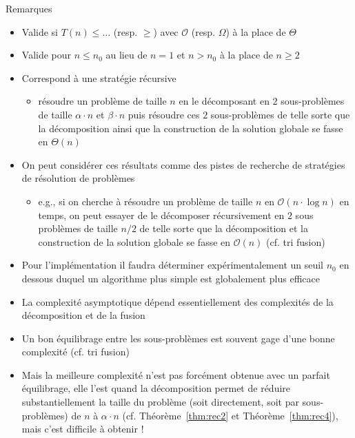 \documentclass[aspectratio=1610,francais,envcountsect]{beamer}
\begin{document}
\begin{frame}[allowframebreaks]
  \framebreak
  \begin{exampleblock}{Remarques}
    \begin{itemize}
    \item Valide si $T(n) \leq \ldots$ (resp. $\geq$) avec
      $\mathcal{O}$ (resp. $\Omega$) à la place de $\Theta$
    \item Valide pour $n \leq n_0$ au lieu de $n = 1$ et $n > n_0$ à
      la place de $n \geq 2$
    \item Correspond à une stratégie récursive
      \begin{itemize}
      \item résoudre un problème de taille $n$ en le décomposant en
        $2$ sous-problèmes de taille $\alpha\cdot n$ et $\beta\cdot n$
        puis résoudre ces $2$ sous-problèmes de telle sorte que la
        décomposition ainsi que la construction de la solution globale
        se fasse en $\Theta(n)$
      \end{itemize}
    \end{itemize}
  \end{exampleblock}

  \framebreak

  \begin{itemize}
  \item On peut considérer ces résultats comme des pistes de recherche
    de stratégies de résolution de problèmes
    \begin{itemize}
    \item e.g., si on cherche à résoudre un problème de taille $n$ en
      $\mathcal{O}(n\cdot\log n)$ en temps, on peut essayer de le
      décomposer récursivement en $2$ sous problèmes de taille $n/2$
      de telle sorte que la décomposition et la construction de la
      solution globale se fasse en $\mathcal{O}(n)$ (cf. tri fusion)
    \end{itemize}
  \item Pour l’implémentation il faudra déterminer expérimentalement
    un seuil $n_0$ en dessous duquel un algorithme plus simple est
    globalement plus efficace
  \item La complexité asymptotique dépend essentiellement des
    complexités de la décomposition et de la fusion
  \item Un bon équilibrage entre les sous-problèmes est souvent gage
    d’une bonne complexité (cf. tri fusion)
  \item Mais la meilleure complexité n’est pas forcément obtenue avec
    un parfait équilibrage, elle l’est quand la décomposition permet
    de réduire substantiellement la taille du problème (soit
    directement, soit par sous-problèmes) de $n$ à $\alpha\cdot n$
    (cf. Théorème~\ref{thm:rec2} et Théorème~\ref{thm:rec4}),
    \alert{mais c'est difficile à obtenir !}

  \end{itemize}
  
\end{frame}
\end{document}
